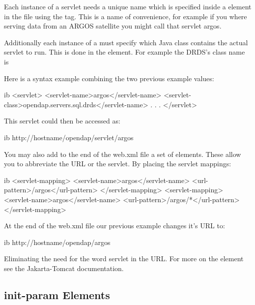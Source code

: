 \documentclass{dods-book}
\begin{document}
Each instance of a servlet needs a unique name which is specified inside a 
 element in the  file using the  tag. 
This is a name of convenience, for example if you where serving data from an 
ARGOS satellite you might call that servlet argos.

Additionally each instance of a  must specify which Java class 
contains the actual servlet to run. This is done in the  
element. For example the DRDS's class name is 

Here is a syntax example combining the two previous example values:

\begin{vcode}{ib}
<servlet>
    <servlet-name>argos</servlet-name>
    <servlet-class>opendap.servers.sql.drds</servlet-name>
    .
    .
    .
</servlet>
\end{vcode}

This servlet could then be accessed as:

\begin{vcode}{ib}
http://hostname/opendap/servlet/argos
\end{vcode}

You may also add to the end of the web.xml file a set of  
elements. These allow you to abbreviate the URL or the servlet. By placing the 
servlet mappings:

\begin{vcode}{ib}
 <servlet-mapping>
    <servlet-name>argos</servlet-name>
    <url-pattern>/argos</url-pattern>
</servlet-mapping>
<servlet-mapping>
    <servlet-name>argos</servlet-name>
    <url-pattern>/argos/*</url-pattern>
</servlet-mapping>
\end{vcode}

At the end of the web.xml file our previous example changes it's URL to:

\begin{vcode}{ib}
http://hostname/opendap/argos
\end{vcode}

Eliminating the need for the word servlet in the URL. For more on the 
 element see the Jakarta-Tomcat documentation.

\subsection{ \lit{<}init-param\lit{>} Elements}
\end{document}
